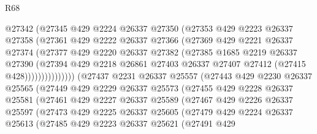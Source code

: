 \begin{lexlean}{R68}
\begin{coremodule}
                      @27342
                      (@27345
                        @429
                        @2224
                        @26337
                        @27350
                        (@27353
                          @429
                          @2223
                          @26337
                          @27358
                          (@27361
                            @429
                            @2222
                            @26337
                            @27366
                            (@27369
                              @429
                              @2221
                              @26337
                              @27374
                              (@27377
                                @429
                                @2220
                                @26337
                                @27382
                                (@27385
                                  @1685
                                  @2219
                                  @26337
                                  @27390
                                  (@27394
                                    @429
                                    @2218
                                    @26861
                                    @27403
                                    @26337
                                    @27407
                                    @27412
                                    (@27415 @428)))))))))))))))
        (@27437
          @2231
          @26337
          @25557
          (@27443
            @429
            @2230
            @26337
            @25565
            (@27449
              @429
              @2229
              @26337
              @25573
              (@27455
                @429
                @2228
                @26337
                @25581
                (@27461
                  @429
                  @2227
                  @26337
                  @25589
                  (@27467
                    @429
                    @2226
                    @26337
                    @25597
                    (@27473
                      @429
                      @2225
                      @26337
                      @25605
                      (@27479
                        @429
                        @2224
                        @26337
                        @25613
                        (@27485
                          @429
                          @2223
                          @26337
                          @25621
                          (@27491
                            @429

\end{coremodule}
\end{lexlean}
